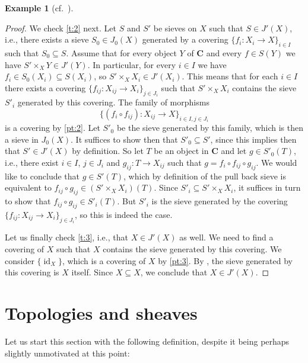 \documentclass[12pt,reqno,a4paper]{amsart}
\theoremstyle{plain}
\theoremstyle{definition}
\newtheorem{exmp}[thm]{Example}
\theoremstyle{remark}
\begin{document}
\begin{exmp}[{cf.~\cite[\href{https://stacks.math.columbia.edu/tag/00ZD}{Tag 00ZD}]{stacks-project}}]
\begin{proof}
    We check \ref{t:2} next.
    Let $S$ and $S'$ be sieves on $X$ such that $S \in J'(X)$, i.e., there exists a sieve $S_{0} \in J_{0}(X)$ generated by a covering $\{ f_{i} \colon X_{i} \to X \}_{i \in I}$ such that $S_{0} \subseteq S$.
    Assume that for every object $Y$ of $\mathbf{C}$ and every $f \in S(Y)$ we have $S' \times_{X} Y \in J'(Y)$.
    In particular, for every $i \in I$ we have $f_{i} \in S_{0}(X_{i}) \subseteq S(X_{i})$, so $S' \times_{X} X_{i} \in J'(X_{i})$.
    This means that for each $i \in I$ there exists a covering $\{ f_{ij} \colon X_{ij} \to X_{i} \}_{j \in J_{i}}$ such that $S' \times_{X} X_{i}$ contains the sieve $S'_{i}$ generated by this covering.
    The family of morphisms
    \[ \{ (f_{i} \circ f_{ij}) \colon X_{ij} \to X \}_{i \in I,j \in J_{i}} \]
    is a covering by \ref{pt:2}.
    Let $S'_{0}$ be the sieve generated by this family, which is then a sieve in $J_{0}(X)$.
    It suffices to show then that $S'_{0} \subseteq S'$, since this implies then that $S' \in J'(X)$ by definition.
    So let $T$ be an object in $\mathbf{C}$ and let $g \in S'_{0}(T)$, i.e., there exist $i \in I$, $j \in J_{i}$ and $g_{ij} \colon T \to X_{ij}$ such that $g = f_{i} \circ f_{ij} \circ g_{ij}$.
    We would like to conclude that $g \in S'(T)$, which by definition of the pull back sieve is equivalent to $f_{ij} \circ g_{ij} \in (S' \times_{X} X_{i})(T)$.
    Since $S'_{i} \subseteq S'\times_{X} X_{i}$, it suffices in turn to show that $f_{ij} \circ g_{ij} \in S'_{i}(T)$.
    But $S'_{i}$ is the sieve generated by the covering $\{ f_{ij} \colon X_{ij} \to X_{i} \}_{j \in J_{i}}$, so this is indeed the case.

    Let us finally check \ref{t:3}, i.e., that $X \in J'(X)$ as well.
    We need to find a covering of $X$ such that $X$ contains the sieve generated by this covering.
    We consider $\{ \operatorname{id}_{X} \}$, which is a covering of $X$ by \ref{pt:3}.
    By , the sieve generated by this covering is $X$ itself.
    Since $X \subseteq X$, we conclude that $X \in J'(X)$.
  \end{proof}
\end{exmp}

\section{Topologies and sheaves}

Let us start this section with the following definition, despite it being perhaps slightly unmotivated at this point:
\end{document}
